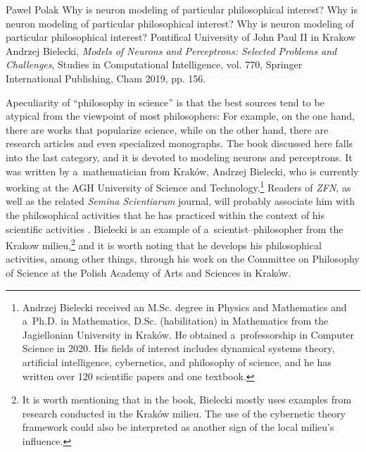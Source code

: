 \begin{newrevengenv}{Paweł Polak}
	{Why is neuron modeling of particular philosophical interest?}
	{Why is neuron modeling of particular philosophical interest?}
	{Why is neuron modeling of particular philosophical interest?}
	{Pontifical University of John Paul II in Krakow}
	{Andrzej Bielecki, \textit{Models of Neurons and Perceptrons: Selected Problems and Challenges}, Studies in Computational Intelligence, vol. 770, Springer International Publishing, Cham 2019, pp. 156.}
	
	
	
%



\lettrine[loversize=0.13,lines=2,lraise=-0.03,nindent=0em,findent=0.2pt]%
{A}{}peculiarity of ``philosophy in science''
\parencites[see][]{heller_how_2019}[][]{polak_philosophy_2019} %
 is that the best sources tend to be atypical from the viewpoint of most philosophers: For example, on the one hand, there are works that popularize science, while on the other hand, there are research articles and even specialized monographs. The book discussed here falls into the last category, and it is devoted to modeling neurons and perceptrons. It was written by a~mathematician from Kraków, Andrzej Bielecki, who is currently working at the AGH University of Science and Technology.\footnote{Andrzej Bielecki received an M.Sc. degree in Physics and Mathematics and a~Ph.D. in Mathematics, D.Sc. (habilitation) in Mathematics from the Jagiellonian University in Kraków. He obtained a~professorship in Computer Science in 2020. His fields of interest includes dynamical systems theory, artificial intelligence, cybernetics, and philosophy of science, and he has written over 120 scientific papers and one textbook.} Readers of \textit{ZFN}, as well as the related \textit{Semina Scientiarum} journal, will probably associate him with the philosophical activities that he has practiced within the context of his scientific activities 
\parencites*[][]{bielecki_cybernetyczna_2016}[][]{bielecki_epistemologiczne_2018}. %
 Bielecki is an example of a~scientist–philosopher from the Krakow milieu,\footnote{It is worth mentioning that in the book, Bielecki mostly uses examples from research conducted in the Kraków milieu. The use of the cybernetic theory framework could also be interpreted as another sign of the local milieu's influence.} and it is worth noting that he develops his philosophical activities, among other things, through his work on the Committee on Philosophy of Science at the Polish Academy of Arts and Sciences in Kraków.


\end{newrevengenv}
